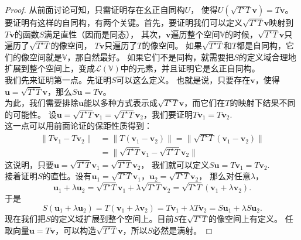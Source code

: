 \documentclass[12pt,UTF8]{ctexbook}
\begin{document}
\begin{proof} %
    从前面讨论可知，只需证明存在幺正自同构$U$，
    使得$U(\sqrt{T^\star T} \mathbf{v}) = T\mathbf{v}$。\\
    要证明有这样的自同构，有两个关键。首先，要证明我们可以定义$\sqrt{T^\star T} \mathbf{v}$映射到$T\mathbf{v}$的函数$S$满足直性（因而是同态），
    其次，$\mathbf{v}$遍历整个空间$\mathbb{V}$的时候，$\sqrt{T^\star T} \mathbf{v}$只遍历了$\sqrt{T^\star T}$的像空间，
    $T\mathbf{v}$只遍历了$T$的像空间。
    如果$\sqrt{T^\star T}$和$T$都是自同构，它们的像空间就是$\mathbb{V}$，那自然最好。
    如果它们不是同构，就需要把$S$的定义域合理地扩展到整个空间上，变成$\mathcal{L}(\mathbb{V})$中的元素，并且证明它是幺正自同构。\\
    我们先来证明第一点。先证明$S$可以这么定义。
    也就是说，只要存在$\mathbf{v}$，使得$\mathbf{u} = \sqrt{T^\star T} \mathbf{v}$，那么$S\mathbf{u} = T\mathbf{v}$。\\
    为此，我们需要排除$\mathbf{u}$能以多种方式表示成$\sqrt{T^\star T} \mathbf{v}$，而它们在$T$的映射下结果不同的可能性。
    设$\mathbf{u} = \sqrt{T^\star T} \mathbf{v}_1 = \sqrt{T^\star T} \mathbf{v}_2$，我们要证明$T\mathbf{v}_1 = T\mathbf{v}_2.$\\
    这一点可以用前面论证的保距性质得到：
    \begin{align*}
        \|T\mathbf{v}_1 - T\mathbf{v}_2\| &= \|T(\mathbf{v}_1 - \mathbf{v}_2)\| = \| \sqrt{T^\star T}(\mathbf{v}_1 - \mathbf{v}_2)\|  \\
        &= \| \sqrt{T^\star T} \mathbf{v}_1 - \sqrt{T^\star T} \mathbf{v}_2\|  
    \end{align*}    
    这说明，只要$\mathbf{u} = \sqrt{T^\star T} \mathbf{v}_1 = \sqrt{T^\star T} \mathbf{v}_2$，
    我们就可以定义$S\mathbf{u} = T\mathbf{v}_1 = T\mathbf{v}_2.$ \\
    接着证明$S$的直性。设有$\mathbf{u}_1 = \sqrt{T^\star T} \mathbf{v}_1$，$\mathbf{u}_2 = \sqrt{T^\star T} \mathbf{v}_2$，
    那么对任意$\lambda$，
    $$ \mathbf{u}_1 + \lambda \mathbf{u}_2 = \sqrt{T^\star T} \mathbf{v}_1 + \lambda \sqrt{T^\star T} \mathbf{v}_2 = \sqrt{T^\star T} (\mathbf{v}_1 + \lambda \mathbf{v}_2).$$
    于是
    $$ S(\mathbf{u}_1 + \lambda \mathbf{u}_2) = T (\mathbf{v}_1 + \lambda \mathbf{v}_2) = T\mathbf{v}_1 + \lambda T\mathbf{v}_2 = S\mathbf{u}_1 + \lambda S\mathbf{u}_2.$$
    现在我们把$S$的定义域扩展到整个空间上。目前$S$在$\sqrt{T^\star T}$的像空间上有定义。
    任取向量$\mathbf{u} = T\mathbf{v}$，可以构造$\sqrt{T^\star T} \mathbf{v}$，所以$S$必然是满射。

\end{proof}
\end{document}
